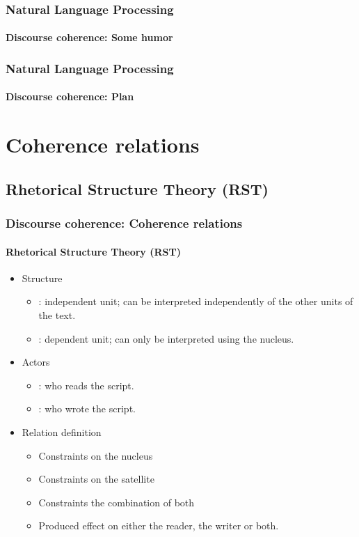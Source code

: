 \documentclass[xcolor=table]{beamer}
\begin{document}
\begin{frame}
\frametitle{Natural Language Processing}
\framesubtitle{Discourse coherence: Some humor}

\begin{center}
\end{center}

\end{frame}

\begin{frame}
\frametitle{Natural Language Processing}
\framesubtitle{Discourse coherence: Plan}

\begin{multicols}{2}
\tableofcontents
\end{multicols}
\end{frame}

\section{Coherence relations}

\subsection{Rhetorical Structure Theory (RST)}

\begin{frame}
\frametitle{Discourse coherence: Coherence relations}
\framesubtitle{Rhetorical Structure Theory (RST)}
	
	\begin{itemize}
		\item Structure  
		\begin{itemize}
			\item {} : independent unit; can be interpreted independently of the other units of the text.
			\item {}: dependent unit; can only be interpreted using the nucleus.
		\end{itemize}
		\item Actors
		\begin{itemize}
			\item {}: who reads the script.
			\item {}: who wrote the script.
		\end{itemize}
		\item Relation definition
		\begin{itemize}
			\item Constraints on the nucleus
			\item Constraints on the satellite 
			\item Constraints the combination of both 
			\item Produced effect on either the reader, the writer or both.
		\end{itemize}
	\end{itemize}
	
\end{frame}
\end{document}
